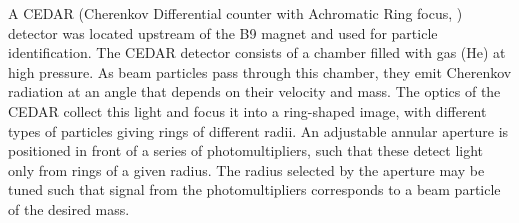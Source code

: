 A CEDAR (Cherenkov Differential counter with Achromatic Ring focus, \cite{CEDAR_note}) detector was located upstream of the B9 magnet and used for particle identification. The CEDAR detector consists of a chamber filled with gas (He) at high pressure. As beam particles pass through this chamber, they  emit Cherenkov radiation at an angle that depends on their velocity and mass. The optics of the CEDAR  collect this light and focus it into a ring-shaped image, with different types of particles giving rings of different radii. An adjustable annular aperture is positioned in front of a series of photomultipliers, such that these detect light only from rings of a given radius. The radius selected by the aperture may be tuned such that signal from the photomultipliers corresponds to a beam particle of the desired mass.


%
%
%
%
%
%
%
%
%
%
%



